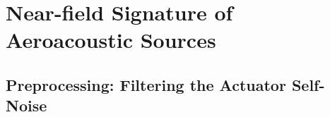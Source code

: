 \chapter{Near-field Signature of Aeroacoustic Sources}
\section{Preprocessing: Filtering the Actuator Self-Noise}